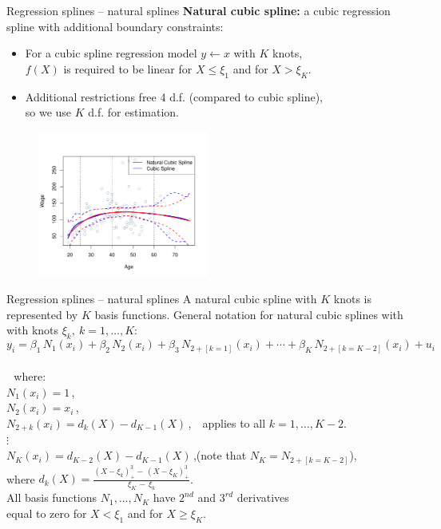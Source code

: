 \documentclass{beamer}
\begin{document}
\begin{frame}{Regression splines -- natural splines}
\textbf{Natural cubic spline:} a cubic regression spline with additional boundary constraints:\\
\smallskip
\begin{itemize}
    \item For a cubic spline regression model $y \leftarrow x$ with $K$ knots, \\$f(X)$ is required to be linear for $X \leq \xi_1$ and for $X > \xi_K$.
    \smallskip
    \item Additional restrictions free 4 d.f. (compared to cubic spline), \\so we use $K$ d.f. for estimation.
\end{itemize}
\vspace{-0.4cm}
\begin{figure}
  \centering
  \includegraphics[trim=0cm 0cm 0cm 1cm, clip=true, width=0.5\textwidth]{IMG/ISLR74.pdf}
\end{figure}
\end{frame}
\begin{frame}{Regression splines -- natural splines}
\small
A natural cubic spline with $K$ knots is represented by $K$ basis functions. General notation for natural cubic splines with with knots $\xi_k,~k=1,\dots, K$:
$$y_i = \beta_1 \, N_1 (x_i)  + \beta_2 \, N_2 (x_i) + \beta_3 \, N_{2+[k=1]} (x_i) + \cdots + \beta_{K} \, N_{2+[k=K-2]} (x_i) + u_i  $$\\
\vspace{-0.2cm}
~\,where:\\
\smallskip
\qquad $N_1 (x_i) = 1$\,,\\
\smallskip
\qquad $N_2 (x_i) = x_i$\,,\\
\smallskip
\qquad $N_{2+k} (x_i) = d_k(X)-d_{K-1}(X)\,$,\qquad ~~applies to all $k=1,\dots,K\!-\!2$.\\
\qquad $\vdots$\\
\smallskip
\qquad $N_{K} (x_i) = d_{K-2}(X)-d_{K-1}(X)\,$,\qquad (note that $N_K=N_{2+[k=K-2]}$),\\
\bigskip
\qquad where $d_k(X)=\frac{(X-\xi_k)_{+}^3 - \, (X-\xi_K)_{+}^3}{\xi_K \,-\, \xi_k}$.\\
\bigskip
All basis functions $N_1,\dots,N_{K}$ have $2^{nd}$ and $3^{rd}$ derivatives \\equal to zero for $X < \xi_1$ and for $X \geq \xi_K$.
\end{frame}
\end{document}
